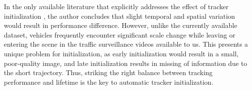 
In the only available literature that explicitly addresses the effect of tracker initialization \cite{Wu_2013_CVPR}, the author concludes that slight temporal and spatial variation would result in performance difference. 
However, unlike the currently available dataset, vehicles frequently encounter significant scale change while leaving or entering the scene in the traffic surveillance videos available to us. This presents a unique problem for initialization, as early initialization would result in a small, poor-quality image, and late initialization results in missing of information due to the short trajectory. Thus, striking the right balance between tracking performance and lifetime is the key to automatic tracker initialization.


